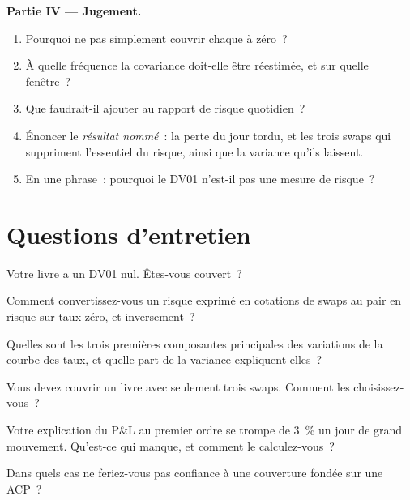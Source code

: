 \begin{problem}
\medskip\noindent\textbf{Partie IV --- Jugement.}
\begin{enumerate}[resume]
\item Pourquoi ne pas simplement couvrir chaque  à zéro~?
\item À quelle fréquence la covariance doit-elle être réestimée, et sur quelle fenêtre~?
\item Que faudrait-il ajouter au rapport de risque quotidien~?
\item Énoncer le \emph{résultat nommé}~: la perte du jour tordu, et les trois
swaps qui suppriment l'essentiel du risque, ainsi que la variance qu'ils laissent.
\item En une phrase~: pourquoi le DV01 n'est-il pas une mesure de risque~?
\end{enumerate}
\end{problem}

\section{Questions d'entretien}

\begin{interviewq}\label{iq:rc:rates-risk:1}
Votre livre a un DV01 nul. Êtes-vous couvert~?
\end{interviewq}

\begin{interviewq}\label{iq:rc:rates-risk:2}
Comment convertissez-vous un risque exprimé en cotations de swaps au pair en risque sur taux zéro, et inversement~?
\end{interviewq}

\begin{interviewq}\label{iq:rc:rates-risk:3}
Quelles sont les trois premières composantes principales des variations de la courbe des taux, et
quelle part de la variance expliquent-elles~?
\end{interviewq}

\begin{interviewq}\label{iq:rc:rates-risk:4}
Vous devez couvrir un livre avec seulement trois swaps. Comment les choisissez-vous~?
\end{interviewq}

\begin{interviewq}\label{iq:rc:rates-risk:5}
Votre explication du P\&L au premier ordre se trompe de 3~\% un jour de grand mouvement. Qu'est-ce
qui manque, et comment le calculez-vous~?
\end{interviewq}

\begin{interviewq}\label{iq:rc:rates-risk:6}
Dans quels cas ne feriez-vous pas confiance à une couverture fondée sur une ACP~?
\end{interviewq}
